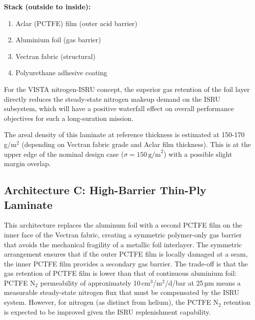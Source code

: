 \bigskip
\noindent \textbf{Stack (outside to inside):}
\begin{enumerate}[parsep=0pt]
\item Aclar (PCTFE) film (outer acid barrier)
\item Aluminium foil (gas barrier)
\item Vectran fabric (structural)
\item Polyurethane adhesive coating
\end{enumerate}

\medskip


\noindent For the VISTA nitrogen-ISRU concept, the superior gas retention of the foil layer directly reduces the steady-state nitrogen makeup demand on the ISRU subsystem, which will have a positive waterfall effect on overall performance objectives for such a long-suration mission.

\medskip

\noindent The areal density of this laminate at reference thickness is estimated at 150-170\,g/m$^2$ (depending on Vectran fabric grade and Aclar film thickness). This is at the upper edge of the nominal design case ($\sigma = 150\,\text{g/m}^2$) with a possible slight margin overlap.



\subsection{Architecture C: High-Barrier Thin-Ply Laminate}
\label{ssec:arch-c}

\noindent This architecture replaces the aluminum foil with a second PCTFE film on the inner face of the Vectran fabric, creating a symmetric polymer-only gas barrier that avoids the mechanical fragility of a metallic foil interlayer. The symmetric arrangement ensures that if the outer PCTFE film is locally damaged at a seam, the inner PCTFE film provides a secondary gas barrier. The trade-off is that the gas retention of PCTFE film is lower than that of continuous aluminium foil: PCTFE N$_2$ permeability of approximately 10\,cm$^3$/m$^2$/d/bar at 25\,µm means a measurable steady-state nitrogen flux that must be compensated by the ISRU system. However, for nitrogen (as distinct from helium), the PCTFE N$_2$ retention is expected to be improved given the ISRU replenishment capability.

